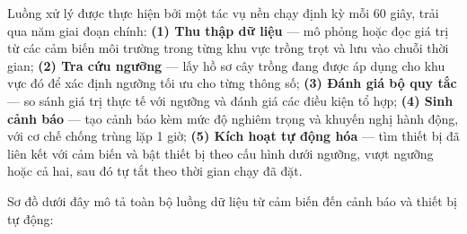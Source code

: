 \documentclass[13pt,a4paper]{extarticle}
\numberwithin{figure}{section}
\numberwithin{table}{section}
\begin{document}
	Luồng xử lý được thực hiện bởi một tác vụ nền chạy định kỳ mỗi 60 giây, trải qua năm giai đoạn chính: \textbf{(1) Thu thập dữ liệu} --- mô phỏng hoặc đọc giá trị từ các cảm biến môi trường trong từng khu vực trồng trọt và lưu vào chuỗi thời gian; \textbf{(2) Tra cứu ngưỡng} --- lấy hồ sơ cây trồng đang được áp dụng cho khu vực đó để xác định ngưỡng tối ưu cho từng thông số; \textbf{(3) Đánh giá bộ quy tắc} --- so sánh giá trị thực tế với ngưỡng và đánh giá các điều kiện tổ hợp; \textbf{(4) Sinh cảnh báo} --- tạo cảnh báo kèm mức độ nghiêm trọng và khuyến nghị hành động, với cơ chế chống trùng lặp 1 giờ; \textbf{(5) Kích hoạt tự động hóa} --- tìm thiết bị đã liên kết với cảm biến và bật thiết bị theo cấu hình dưới ngưỡng, vượt ngưỡng hoặc cả hai, sau đó tự tắt theo thời gian chạy đã đặt.
	
	Sơ đồ dưới đây mô tả toàn bộ luồng dữ liệu từ cảm biến đến cảnh báo và thiết bị tự động:
	
\end{document}
